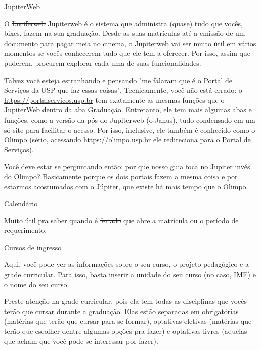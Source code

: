 \begin{secao}{JupiterWeb}

O \sout{Luciferweb} Jupiterweb é o sistema que administra (quase) tudo que
vocês, bixes, fazem na sua graduação. Desde as suas matrículas até a emissão de
um documento para pagar meia no cinema, o Jupiterweb vai ser muito útil em
vários momentos se vocês conhecerem tudo que ele tem a oferecer. Por isso,
assim que puderem, procurem explorar cada uma de suas funcionalidades.

Talvez você esteja estranhando e pensando "me falaram que é o Portal de Serviços da USP
que faz essas coisas". Tecnicamente, você não está errado: o \url{https://portalservicos.usp.br}
tem exatamente as mesmas funções que o JupiterWeb dentro da aba Graduação.
Entretanto, ele tem mais algumas abas e funções, como a versão da pós do Jupiterweb (o Janus),
tudo condensado em um só site para facilitar o acesso.
Por isso, inclusive, ele também é conhecido como o Olimpo (sério, acessando \url{https://olimpo.usp.br}
ele redireciona para o Portal de Serviços).

Você deve estar se perguntando então: por que nosso guia foca no Jupiter invés do Olimpo?
Basicamente porque os dois portais fazem a mesma coisa e por estarmos acostumados com o Júpiter,
que existe há mais tempo que o Olimpo.



\begin{subsecao}{Calendário}

Muito útil pra saber quando é \sout{feriado} que abre a matrícula ou o período
de requerimento.

\end{subsecao}

\begin{subsecao}{Cursos de ingresso}

Aqui, você pode ver as informações sobre o seu curso, o projeto pedagógico e
a grade curricular. Para isso, basta inserir a unidade do seu curso (no caso,
IME) e o nome do seu curso.

Preste atenção na grade curricular, pois ela tem todas as disciplinas que
vocês terão que cursar durante a graduação. Elas estão separadas em obrigatórias
(matérias que terão que cursar para se formar), optativas eletivas (matérias
que terão que escolher dentre algumas opções pra fazer) e optativas livres
(aquelas que acham que você pode se interessar por fazer).


\end{subsecao}
\end{secao}
